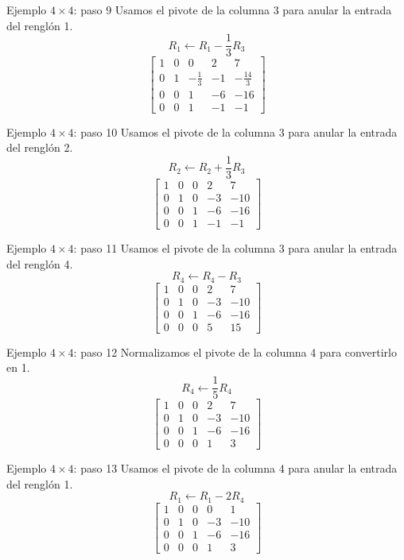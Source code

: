 \documentclass[aspectratio=169,9pt]{beamer}
\theoremstyle{remark}
\begin{document}
\begin{frame}[t]{Ejemplo $4\times4$: paso 9}
Usamos el pivote de la columna 3 para anular la entrada del renglón 1.
\[
R_{1}\leftarrow R_{1}-\frac{1}{3}R_{3}
\]
\[
\left[\begin{array}{cccc|c}
1 & 0 & 0 & 2 & 7\\
0 & 1 & - \frac{1}{3} & -1 & - \frac{14}{3}\\
0 & 0 & 1 & -6 & -16\\
0 & 0 & 1 & -1 & -1
\end{array}\right]
\]
\end{frame}
\begin{frame}[t]{Ejemplo $4\times4$: paso 10}
Usamos el pivote de la columna 3 para anular la entrada del renglón 2.
\[
R_{2}\leftarrow R_{2}+\frac{1}{3}R_{3}
\]
\[
\left[\begin{array}{cccc|c}
1 & 0 & 0 & 2 & 7\\
0 & 1 & 0 & -3 & -10\\
0 & 0 & 1 & -6 & -16\\
0 & 0 & 1 & -1 & -1
\end{array}\right]
\]
\end{frame}
\begin{frame}[t]{Ejemplo $4\times4$: paso 11}
Usamos el pivote de la columna 3 para anular la entrada del renglón 4.
\[
R_{4}\leftarrow R_{4}-R_{3}
\]
\[
\left[\begin{array}{cccc|c}
1 & 0 & 0 & 2 & 7\\
0 & 1 & 0 & -3 & -10\\
0 & 0 & 1 & -6 & -16\\
0 & 0 & 0 & 5 & 15
\end{array}\right]
\]
\end{frame}
\begin{frame}[t]{Ejemplo $4\times4$: paso 12}
Normalizamos el pivote de la columna 4 para convertirlo en 1.
\[
R_{4}\leftarrow \frac{1}{5}R_{4}
\]
\[
\left[\begin{array}{cccc|c}
1 & 0 & 0 & 2 & 7\\
0 & 1 & 0 & -3 & -10\\
0 & 0 & 1 & -6 & -16\\
0 & 0 & 0 & 1 & 3
\end{array}\right]
\]
\end{frame}
\begin{frame}[t]{Ejemplo $4\times4$: paso 13}
Usamos el pivote de la columna 4 para anular la entrada del renglón 1.
\[
R_{1}\leftarrow R_{1}-2R_{4}
\]
\[
\left[\begin{array}{cccc|c}
1 & 0 & 0 & 0 & 1\\
0 & 1 & 0 & -3 & -10\\
0 & 0 & 1 & -6 & -16\\
0 & 0 & 0 & 1 & 3
\end{array}\right]
\]
\end{frame}
\end{document}
